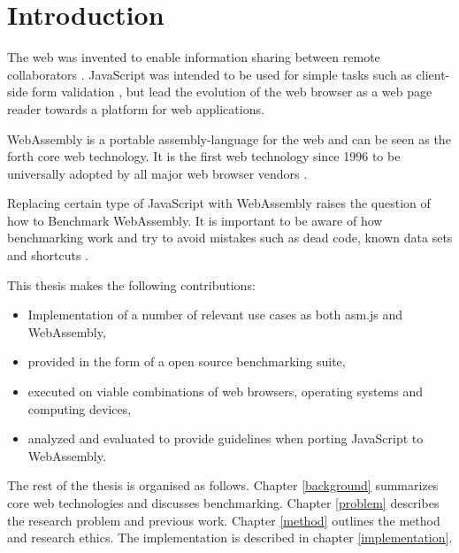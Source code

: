 \section{Introduction}
\label{introduction}

The web was invented to enable information sharing between remote collaborators \parencite{BernersLeeCailliauLuotonenNielsenSecret1994}. JavaScript was intended to be used for simple tasks such as client-side form validation \parencite{Moller2018}, but lead the evolution of the web browser as a web page reader towards a platform for web applications.

WebAssembly is a portable assembly-language for the web \parencite{HaasRossbergSchuffTitzerHolmanGohmanWagnerZakaiBastien2017} and can be seen as the forth core web technology. It is the first web technology since 1996 to be universally adopted by all major web browser vendors \parencite{HaasRossbergSchuffTitzerHolmanGohmanWagnerZakaiBastien2017}.

Replacing certain type of JavaScript with WebAssembly raises the question of how to Benchmark WebAssembly. It is important to be aware of how benchmarking work and try to avoid mistakes such as dead code, known data sets and shortcuts \parencite{CaiNerurkarWu1998}.

This thesis makes the following contributions:

\begin{itemize}
    \item Implementation of a number of relevant use cases as both asm.js and WebAssembly,
    \item provided in the form of a open source benchmarking suite,
    \item executed on viable combinations of web browsers, operating systems and computing devices,
    \item analyzed and evaluated to provide guidelines when porting JavaScript to WebAssembly.
\end{itemize}

The rest of the thesis is organised as follows. Chapter \ref{background} summarizes core web technologies and discusses benchmarking. Chapter \ref{problem} describes the research problem and previous work. Chapter \ref{method} outlines the method and research ethics. The implementation is described in chapter \ref{implementation}.
